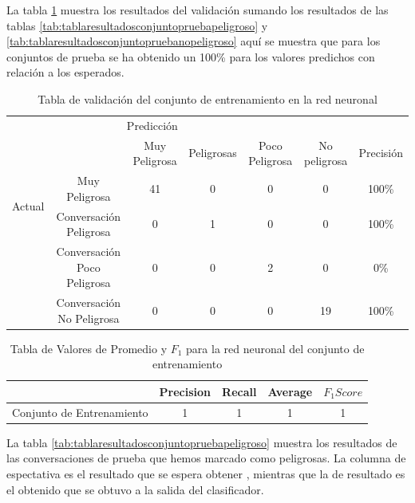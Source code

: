 La tabla \ref{tab:redpruebas} muestra los resultados del validaci\'on sumando los resultados de las tablas \ref{tab:tablaresultadosconjuntopruebapeligroso} y \ref{tab:tablaresultadosconjuntopruebanopeligroso} aquí se muestra que para los conjuntos de prueba se ha obtenido un 100\% para los valores predichos con relaci\'on a los esperados.
\begin{table}[h]
\begin{center}
\begin{tabular}{c|c|c|c|c|c|c|}
\multicolumn{5}{c}{Predicci\'on} \\
\cline{2-7}
& &  Muy Peligrosa & Peligrosas & Poco Peligrosa & No peligrosa &  Precisi\'on \\
\cline{2-7}
\multirow{2}{*}{Actual} & Muy Peligrosa & 41 & 0 & 0 & 0 & 100\% \\
\cline{2-7}
& Conversaci\'on Peligrosa & 0 & 1 &  0 & 0 & 100\% \\
\cline{2-7}
& Conversaci\'on Poco Peligrosa & 0 & 0 &  2 & 0 & 0\% \\
\cline{2-7}
& Conversaci\'on No Peligrosa & 0 & 0 &  0 & 19 & 100\% \\
\cline{2-7}


\end{tabular}
\caption{Tabla de validaci\'on del conjunto de entrenamiento en la red neuronal}
\label{tab:redpruebas}
\end{center}
\end{table}

\begin{table}[h]
\begin{center}
\begin{tabular}{c|cc|c|c|}
& Precision & Recall & Average & $F_1 Score$ \\
\hline
Conjunto de Entrenamiento & 1 & 1 & 1 &  1 \\ 

\end{tabular}

\label{tab:valores}
\caption{Tabla de Valores de Promedio y $F_1$ para la red neuronal del conjunto de entrenamiento}
\end{center}
\end{table}


La tabla \ref{tab:tablaresultadosconjuntopruebapeligroso} muestra los resultados de las conversaciones de prueba que hemos marcado como peligrosas. La columna de espectativa es el resultado que se espera obtener , mientras que la de resultado es el obtenido que se obtuvo a la salida del clasificador.

